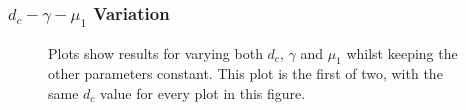 \subsubsection*{$d_c - \gamma - \mu_1$ Variation}
\begin{figure}[h]
    \centering
    \caption{Plots show results for varying both $d_c$, $\gamma$ and $\mu_1$ whilst keeping the other parameters constant. This plot is the first of two, with the same $d_c$ value for every plot in this figure.}
    \label{fig:prolif_dc_gamma_mu_1_variation_1}
\end{figure}

